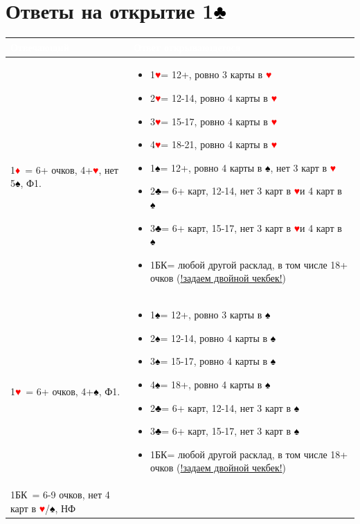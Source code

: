 \documentclass[a4paper,10pt]{article}
\newcommand{\clb}{\textcolor{black}{♣}}
\newcommand{\dia}{\textcolor{red}{♦}}
\newcommand{\hrt}{\textcolor{red}{♥}}
\newcommand{\spd}{\textcolor{black}{♠}}
\newcommand{\NT}{БК}
\begin{document}
\section{Ответы на открытие 1\clb}
\noindent
\begin{tabularx}{\textwidth}{|X|X|}
\hline
\rowcolor{tableHeader} \textcolor{white}{\textbf{Отвечающий}} & \textcolor{white}{\textbf{Ответ открывающегося}} \\ \hline
1\dia\ = 6+ очков, 4+\hrt, нет 5\spd, Ф1. & \begin{itemize}[label=\textcolor{sputnikRed}{\tiny\(\blacksquare\)}, leftmargin=*, nosep]
    \item 1\hrt = 12+, ровно 3 карты в \hrt
    \item 2\hrt = 12-14, ровно 4 карты в \hrt
    \item 3\hrt = 15-17, ровно 4 карты в \hrt
    \item 4\hrt = 18-21, ровно 4 карты в \hrt
    \item 1\spd = 12+, ровно 4 карты в \spd, нет 3 карт в \hrt
    \item 2\clb = 6+ карт, 12-14, нет 3 карт в \hrt и 4 карт в \spd
    \item 3\clb = 6+ карт, 15-17, нет 3 карт в \hrt и 4 карт в \spd
    \item 1\NT = любой другой расклад, в том числе 18+ очков (\hyperlink{sec:double-checkback}{!задаем двойной чекбек!})
\end{itemize} \\ \hline
1\hrt\ = 6+ очков, 4+\spd, Ф1. & \begin{itemize}[label=\textcolor{sputnikRed}{\tiny\(\blacksquare\)}, leftmargin=*, nosep]
    \item 1\spd = 12+, ровно 3 карты в \spd
    \item 2\spd = 12-14, ровно 4 карты в \spd
    \item 3\spd = 15-17, ровно 4 карты в \spd
    \item 4\spd = 18+, ровно 4 карты в \spd
    \item 2\clb = 6+ карт, 12-14, нет 3 карт в \spd
    \item 3\clb = 6+ карт, 15-17, нет 3 карт в \spd
    \item 1\NT = любой другой расклад, в том числе 18+ очков (\hyperlink{sec:double-checkback}{!задаем двойной чекбек!})
\end{itemize} \\ \hline
1\NT\ = 6-9 очков, нет 4 карт в \hrt/\spd, НФ &
\begin{itemize}[label=\textcolor{sputnikRed}{\tiny\(\blacksquare\)}, leftmargin=*, nosep]

\end{itemize}
\end{tabularx}
\end{document}
